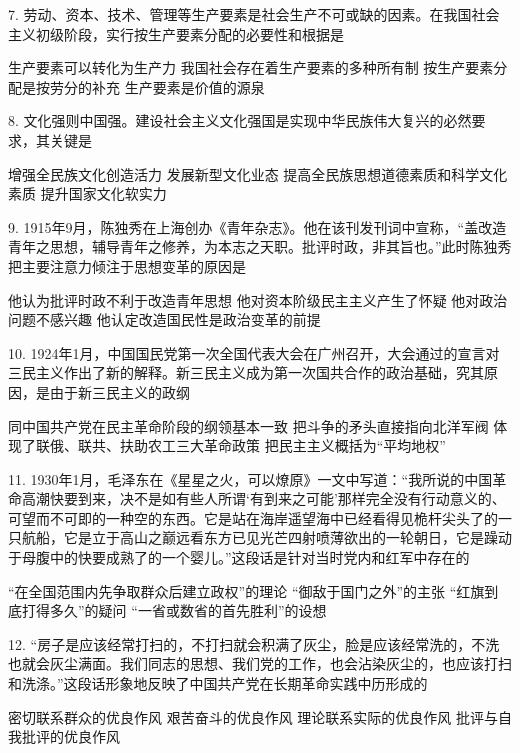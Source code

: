 7. 劳动、资本、技术、管理等生产要素是社会生产不可或缺的因素。在我国社会主义初级阶段，实行按生产要素分配的必要性和根据是
\begin{choices}
	 生产要素可以转化为生产力
	 我国社会存在着生产要素的多种所有制
	 按生产要素分配是按劳分的补充
	 生产要素是价值的源泉
\end{choices}

8. 文化强则中国强。建设社会主义文化强国是实现中华民族伟大复兴的必然要求，其关键是
\begin{choices}
	 增强全民族文化创造活力
	 发展新型文化业态
	 提高全民族思想道德素质和科学文化素质
	 提升国家文化软实力
\end{choices}

9. 1915年9月，陈独秀在上海创办《青年杂志》。他在该刊发刊词中宣称，“盖改造青年之思想，辅导青年之修养，为本志之天职。批评时政，非其旨也。”此时陈独秀把主要注意力倾注于思想变革的原因是
\begin{choices}
	 他认为批评时政不利于改造青年思想
	 他对资本阶级民主主义产生了怀疑
	 他对政治问题不感兴趣
	 他认定改造国民性是政治变革的前提
\end{choices}

10. 1924年1月，中国国民党第一次全国代表大会在广州召开，大会通过的宣言对三民主义作出了新的解释。新三民主义成为第一次国共合作的政治基础，究其原因，是由于新三民主义的政纲
\begin{choices}
	 同中国共产党在民主革命阶段的纲领基本一致
	 把斗争的矛头直接指向北洋军阀
	 体现了联俄、联共、扶助农工三大革命政策
	 把民主主义概括为“平均地权”
\end{choices}

11. 1930年1月，毛泽东在《星星之火，可以燎原》一文中写道：“我所说的中国革命高潮快要到来，决不是如有些人所谓‘有到来之可能’那样完全没有行动意义的、可望而不可即的一种空的东西。它是站在海岸遥望海中已经看得见桅杆尖头了的一只航船，它是立于高山之巅远看东方已见光芒四射喷薄欲出的一轮朝日，它是躁动于母腹中的快要成熟了的一个婴儿。”这段话是针对当时党内和红军中存在的
\begin{choices}
	 “在全国范围内先争取群众后建立政权”的理论
	 “御敌于国门之外”的主张
	 “红旗到底打得多久”的疑问
	 “一省或数省的首先胜利”的设想
\end{choices}

12.  “房子是应该经常打扫的，不打扫就会积满了灰尘，脸是应该经常洗的，不洗也就会灰尘满面。我们同志的思想、我们党的工作，也会沾染灰尘的，也应该打扫和洗涤。”这段话形象地反映了中国共产党在长期革命实践中历形成的
\begin{choices}
	 密切联系群众的优良作风
	 艰苦奋斗的优良作风
	 理论联系实际的优良作风
	 批评与自我批评的优良作风
\end{choices}

